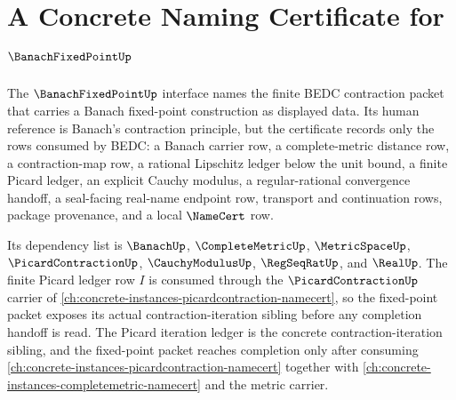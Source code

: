 \chapter{A Concrete Naming Certificate for $\BanachFixedPointUp$}
\label{ch:concrete-instances-banach-fixed-point-namecert}

The $\BanachFixedPointUp$ interface names the finite BEDC contraction packet that carries a Banach fixed-point construction as displayed data. Its human reference is Banach's contraction principle, but the certificate records only the rows consumed by BEDC: a Banach carrier row, a complete-metric distance row, a contraction-map row, a rational Lipschitz ledger below the unit bound, a finite Picard ledger, an explicit Cauchy modulus, a regular-rational convergence handoff, a seal-facing real-name endpoint row, transport and continuation rows, package provenance, and a local $\NameCert$ row.

Its dependency list is $\BanachUp$, $\CompleteMetricUp$, $\MetricSpaceUp$, $\PicardContractionUp$, $\CauchyModulusUp$, $\RegSeqRatUp$, and $\RealUp$. The finite Picard ledger row $I$ is consumed through the $\PicardContractionUp$ carrier of \autoref{ch:concrete-instances-picardcontraction-namecert}, so the fixed-point packet exposes its actual contraction-iteration sibling before any completion handoff is read. The Picard iteration ledger is the concrete contraction-iteration sibling, and the fixed-point packet reaches completion only after consuming \autoref{ch:concrete-instances-picardcontraction-namecert} together with \autoref{ch:concrete-instances-completemetric-namecert} and the metric carrier.

